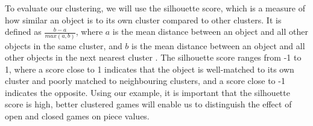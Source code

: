 \documentclass[%
 superscriptaddress,
showpacs,preprintnumbers,
 amsmath,
 amssymb,
 aps,
 pra,
showkeys,
onecolumn,
notitlepage,
11pt,
tightenlines      %
]{revtex4-1}
\begin{document}
    
    


To evaluate our clustering, we will use the silhouette score, which is a measure of how similar an object is to its own cluster compared to other clusters. It is defined as $\frac{b - a}{max(a, b)}$, where $a$ is the mean distance between an object and all other objects in the same cluster, and $b$ is the mean distance between an object and all other objects in the next nearest cluster \cite{shahapure2020cluster}. The silhouette score ranges from -1 to 1, where a score close to 1 indicates that the object is well-matched to its own cluster and poorly matched to neighbouring clusters, and a score close to -1 indicates the opposite. Using our example, it is important that the silhouette score is high, better clustered games will enable us to distinguish the effect of open and closed games on piece values.
\end{document}
